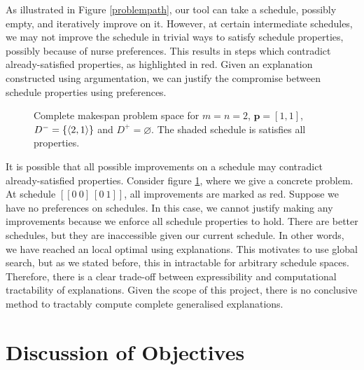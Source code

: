 As illustrated in Figure \ref{problempath}, our tool can take a schedule, possibly empty, and iteratively improve on it. However, at certain intermediate schedules, we may not improve the schedule in trivial ways to satisfy schedule properties, possibly because of nurse preferences. This results in steps which contradict already-satisfied properties, as highlighted in red. Given an explanation constructed using argumentation, we can justify the compromise between schedule properties using preferences.

\begin{figure}[H]
	\label{problemspace}
	
	\caption{Complete makespan problem space for $m=n=2$, $\mathbf{p}=[1,1]$, $D^-=\{\langle{2},{1}\rangle\}$ and $D^+=\varnothing$. The shaded schedule is satisfies all properties.}
\end{figure}

It is possible that all possible improvements on a schedule may contradict already-satisfied properties. Consider figure \ref{problemspace}, where we give a concrete problem. At schedule $[[0\ 0]\ [0\ 1]]$, all improvements are marked as red. Suppose we have no preferences on schedules. In this case, we cannot justify making any improvements because we enforce all schedule properties to hold. There are better schedules, but they are inaccessible given our current schedule. In other words, we have reached an local optimal using explanations. This motivates to use global search, but as we stated before, this in intractable for arbitrary schedule spaces. Therefore, there is a clear trade-off between expressibility and computational tractability of explanations. Given the scope of this project, there is no conclusive method to tractably compute complete generalised explanations.

\section{Discussion of Objectives}


